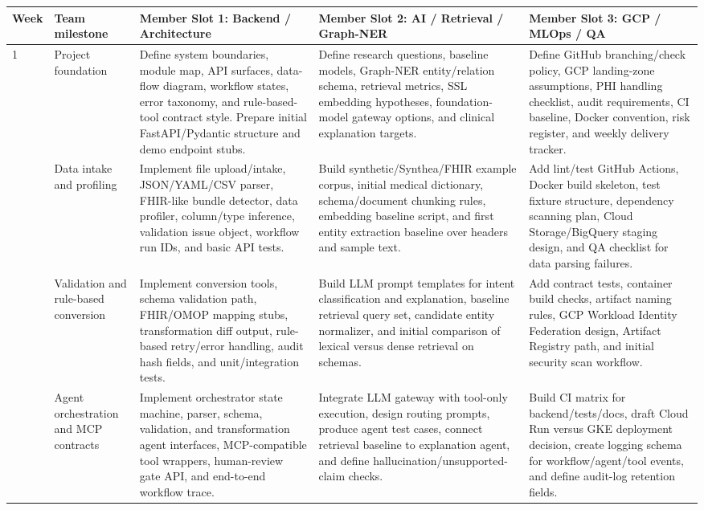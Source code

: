 {\scriptsize
\setlength{\tabcolsep}{3pt}
\renewcommand{\arraystretch}{1.18}
\begin{longtable}{p{}p{}p{}p{}p{}}
\toprule
\textbf{Week} & \textbf{Team milestone} & \textbf{Member Slot 1: Backend / Architecture} & \textbf{Member Slot 2: AI / Retrieval / Graph-NER} & \textbf{Member Slot 3: GCP / MLOps / QA} \\
\midrule
1 & Project foundation & Define system boundaries, module map, API surfaces, data-flow diagram, workflow states, error taxonomy, and rule-based-tool contract style. Prepare initial FastAPI/Pydantic structure and demo endpoint stubs. & Define research questions, baseline models, Graph-NER entity/relation schema, retrieval metrics, SSL embedding hypotheses, foundation-model gateway options, and clinical explanation targets. & Define GitHub branching/check policy, GCP landing-zone assumptions, PHI handling checklist, audit requirements, CI baseline, Docker convention, risk register, and weekly delivery tracker. \\
\addlinespace
2 & Data intake and profiling & Implement file upload/intake, JSON/YAML/CSV parser, FHIR-like bundle detector, data profiler, column/type inference, validation issue object, workflow run IDs, and basic API tests. & Build synthetic/Synthea/FHIR example corpus, initial medical dictionary, schema/document chunking rules, embedding baseline script, and first entity extraction baseline over headers and sample text. & Add lint/test GitHub Actions, Docker build skeleton, test fixture structure, dependency scanning plan, Cloud Storage/BigQuery staging design, and QA checklist for data parsing failures. \\
\addlinespace
3 & Validation and rule-based conversion & Implement conversion tools, schema validation path, FHIR/OMOP mapping stubs, transformation diff output, rule-based retry/error handling, audit hash fields, and unit/integration tests. & Build LLM prompt templates for intent classification and explanation, baseline retrieval query set, candidate entity normalizer, and initial comparison of lexical versus dense retrieval on schemas. & Add contract tests, container build checks, artifact naming rules, GCP Workload Identity Federation design, Artifact Registry path, and initial security scan workflow. \\
\addlinespace
4 & Agent orchestration and MCP contracts & Implement orchestrator state machine, parser, schema, validation, and transformation agent interfaces, MCP-compatible tool wrappers, human-review gate API, and end-to-end workflow trace. & Integrate LLM gateway with tool-only execution, design routing prompts, produce agent test cases, connect retrieval baseline to explanation agent, and define hallucination/unsupported-claim checks. & Build CI matrix for backend/tests/docs, draft Cloud Run versus GKE deployment decision, create logging schema for workflow/agent/tool events, and define audit-log retention fields. \\

\end{longtable}}
